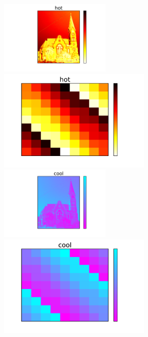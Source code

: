 \documentclass{beamer}
\begin{document}
\begin{frame}
\begin{columns}
\begin{column}{0.5\textwidth}
\end{column}
\begin{column}{0.5\textwidth}
\begin{center}
\vfill
\includegraphics[width=0.42\textwidth]{../church_hot.pdf}
\includegraphics[width=0.58\textwidth]{../magicsquare_hot.pdf}\newline\newline
\vfill
\includegraphics[width=0.42\textwidth]{../church_cool.pdf}
\includegraphics[width=0.58\textwidth]{../magicsquare_cool.pdf}
\vfill
\end{center}
\end{column}
\end{columns}
\end{frame}
\end{document}
